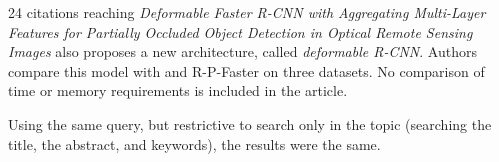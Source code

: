24 citations reaching \textit{Deformable Faster R-CNN with Aggregating Multi-Layer Features for Partially Occluded Object Detection in Optical Remote Sensing Images} also proposes a new architecture, called \textit{deformable R-CNN}. Authors compare this model with  and R-P-Faster  \cite{rp-faster-rcnn} on three datasets. No comparison of time or memory requirements is included in the article.

Using the same query, but restrictive to search only in the topic (searching the title, the abstract, and keywords), the results were the same.








